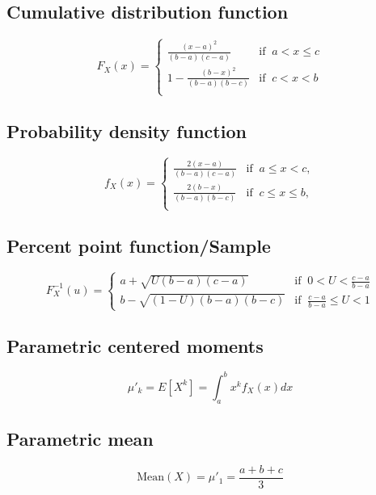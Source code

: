\documentclass{article}
\begin{document}
\subsection{Cumulative distribution function}
\begin{equation*} F_{X}\left(x\right)=\left\{\begin{array}{cl}\frac{(x-a)^2}{(b-a)(c-a)} & \text{if } \ a < x \leq c \\ 1-\frac{(b-x)^2}{(b-a)(b-c)} & \text{if } \ c < x < b \\ \end{array} \right. \end{equation*}
\subsection{Probability density function}
\begin{equation*} f_{X}\left(x\right)=\left\{\begin{array}{cl}\frac{2(x-a)}{(b-a)(c-a)} & \text{if } \ a \leq x < c,\\ \frac{2(b-x)}{(b-a)(b-c)} & \text{if } \ c \leq x \leq b,\\ \end{array} \right. \end{equation*}
\subsection{Percent point function/Sample}
\begin{equation*} F^{-1}_{X}\left(u\right)=\left\{\begin{array}{cl} a+\sqrt{U(b-a)(c-a)} & \text{if } \ 0 < U < \frac{c-a}{b-a} \\ b-\sqrt{(1-U)(b-a)(b-c)} & \text{if } \ \frac{c-a}{b-a} \leq U < 1 \end{array} \right. \end{equation*}
\subsection{Parametric centered moments}
\begin{equation*} \mu'_{k}=E[X^k]=\int_{a}^{b}x^{k}f_{X}\left(x\right)dx \end{equation*}
\subsection{Parametric mean}
\begin{equation*} \mathrm{Mean}(X)=\mu'_{1}=\frac{a+b+c}{3} \end{equation*}
\end{document}
